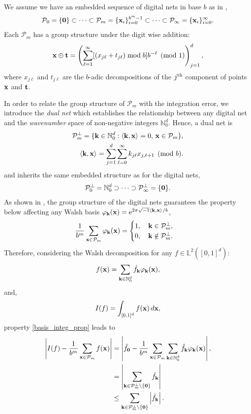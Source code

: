 We assume we have an embedded sequence of digital nets in base $b$ as in \cite[Sec. 2-3]{HicJim},
\[
\mathcal{P}_0=\{\boldsymbol{\mathbf{0}}\}\subset\dots\subset\mathcal{P}_m=\{\boldsymbol{\mathbf{x}}_i\}_{i=0}^{b^m-1}\subset\dots\subset\mathcal{P}_\infty=\{\boldsymbol{\mathbf{x}}_i\}_{i=0}^{\infty}.
\]
Each $\mathcal{P}_m$ has a group structure under the digit wise addition:
\[
\boldsymbol{\mathbf{x}} \oplus \boldsymbol{\mathbf{t}} = \left(\sum_{\ell=1}^{\infty} [(x_{j\ell} + t_{j\ell}) \bmod b] b^{-\ell} \pmod{1} \right)_{j=1}^d,
\]
where $x_{j\ell}$ and $t_{j\ell}$ are the $b$-adic decompositions of the $j^{\rm th}$ component of points $\boldsymbol{\mathbf{x}}$ and $\boldsymbol{\mathbf{t}}$.

In order to relate the group structure of $\mathcal{P}_m$ with the integration error, we introduce the \emph{dual net} which establishes the relationship between any digital net and the \emph{wavenumber} space of non-negative integers $\mathbb{N}_0^d$. Hence, a dual net is
\begin{align*}
\mathcal{P}_m^\perp=\{\boldsymbol{\mathbf{k}}\in\mathbb{N}_0^d:\left \langle \boldsymbol{\mathbf{k}}, \boldsymbol{\mathbf{x}} \right \rangle_{{}}=0,\, \boldsymbol{\mathbf{x}}\in\mathcal{P}_m\}, \\
\left \langle \boldsymbol{\mathbf{k}}, \boldsymbol{\mathbf{x}} \right \rangle_{{}} = \sum_{j=1}^{d} \sum_{\ell=0}^{\infty} k_{j\ell}x_{j,\ell+1}  \pmod b.
\end{align*}
and inherits the same embedded structure as for the digital nets,
\begin{equation}\label{dual_net_structure}
\mathcal{P}_0^\perp=\mathbb{N}_0^d\supset\dots\supset\mathcal{P}_\infty^\perp=\{\boldsymbol{\mathbf{0}}\}.
\end{equation}
As shown in \cite[Sec. 3]{HicJim}, the group structure of the digital nets guarantees the property below affecting any Walsh basis $\varphi_{\boldsymbol{\mathbf{k}}}(\boldsymbol{\mathbf{x}})=\text{e}^{2 \pi \sqrt{-1} \left \langle \boldsymbol{\mathbf{k}}, \boldsymbol{\mathbf{x}} \right \rangle_{{}}/b}$,
\begin{equation}\label{basis_integ_prop}
\frac{1}{b^m}\sum_{\boldsymbol{\mathbf{x}}\in\mathcal{P}_m}\varphi_{\boldsymbol{\mathbf{k}}}(\boldsymbol{\mathbf{x}})=
\begin{cases}
1,\quad \boldsymbol{\mathbf{k}}\in\mathcal{P}_m^\perp, \\
0,\quad \boldsymbol{\mathbf{k}}\notin\mathcal{P}_m^\perp.
\end{cases}
\end{equation}
Therefore, considering the Walsh decomposition for any $f\in \mathbb{L}^2([0,1]^d)$: \[
f(\boldsymbol{\mathbf{x}})=\sum_{\boldsymbol{\mathbf{k}}\in\mathbb{N}_0^d}\hat{f}_{\boldsymbol{\mathbf{k}}}\varphi_{\boldsymbol{\mathbf{k}}}(\boldsymbol{\mathbf{x}}), \]
and,
\[ I(f) = \int_{[0,1]^d} f(\boldsymbol{\mathbf{x}})\,d\boldsymbol{\mathbf{x}},\]
property \eqref{basis_integ_prop} leads to
\begin{align}
\nonumber
\left\lvert I(f) - \frac{1}{b^m}\sum_{\boldsymbol{\mathbf{x}}\in\mathcal{P}_m}f(\boldsymbol{\mathbf{x}})\right\rvert &=
\left\lvert\hat{f}_{\boldsymbol{\mathbf{0}}} - \frac{1}{b^m}\sum_{\boldsymbol{\mathbf{x}}\in\mathcal{P}_m}\sum_{\boldsymbol{\mathbf{k}}\in\mathbb{N}_0^d}\hat{f}_{\boldsymbol{\mathbf{k}}}\varphi_{\boldsymbol{\mathbf{k}}}(\boldsymbol{\mathbf{x}})\right\rvert, \\
\nonumber
&= \left\lvert\sum_{\boldsymbol{\mathbf{k}}\in\mathcal{P}_m^\perp\setminus\{\boldsymbol{\mathbf{0}}\}}\hat{f}_{\boldsymbol{\mathbf{k}}}\right\rvert \\
& \leq \sum_{\boldsymbol{\mathbf{k}}\in\mathcal{P}_m^\perp\setminus\{\boldsymbol{\mathbf{0}}\}}\left\lvert\hat{f}_{\boldsymbol{\mathbf{k}}}\right\rvert. \label{3.1.err_bound}
\end{align}

